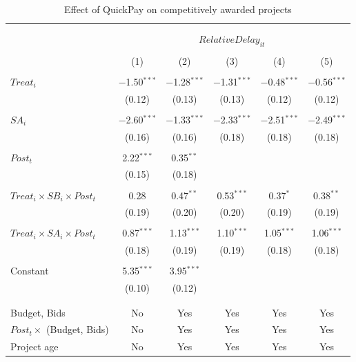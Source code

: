 \documentclass[
]{article}
\begin{document}
\begin{table}[H] \centering 
  \caption{Effect of QuickPay on competitively awarded projects} 
  \label{} 
\small 
\begin{tabular}{@{\extracolsep{-2pt}}lccccc} 
\\[-1.8ex]\hline 
\hline \\[-1.8ex] 
\\[-1.8ex] & \multicolumn{5}{c}{$RelativeDelay_{it}$  } \\ 
\\[-1.8ex] & (1) & (2) & (3) & (4) & (5)\\ 
\hline \\[-1.8ex] 
 $Treat_i$ & $-$1.50$^{***}$ & $-$1.28$^{***}$ & $-$1.31$^{***}$ & $-$0.48$^{***}$ & $-$0.56$^{***}$ \\ 
  & (0.12) & (0.13) & (0.13) & (0.12) & (0.12) \\ 
  & & & & & \\ 
 $SA_i$ & $-$2.60$^{***}$ & $-$1.33$^{***}$ & $-$2.33$^{***}$ & $-$2.51$^{***}$ & $-$2.49$^{***}$ \\ 
  & (0.16) & (0.16) & (0.18) & (0.18) & (0.18) \\ 
  & & & & & \\ 
 $Post_t$ & 2.22$^{***}$ & 0.35$^{**}$ &  &  &  \\ 
  & (0.15) & (0.18) &  &  &  \\ 
  & & & & & \\ 
 $Treat_i \times SB_i \times Post_t$ & 0.28 & 0.47$^{**}$ & 0.53$^{***}$ & 0.37$^{*}$ & 0.38$^{**}$ \\ 
  & (0.19) & (0.20) & (0.20) & (0.19) & (0.19) \\ 
  & & & & & \\ 
 $Treat_i \times SA_i \times Post_t$ & 0.87$^{***}$ & 1.13$^{***}$ & 1.10$^{***}$ & 1.05$^{***}$ & 1.06$^{***}$ \\ 
  & (0.18) & (0.19) & (0.19) & (0.18) & (0.18) \\ 
  & & & & & \\ 
 Constant & 5.35$^{***}$ & 3.95$^{***}$ &  &  &  \\ 
  & (0.10) & (0.12) &  &  &  \\ 
  & & & & & \\ 
\hline \\[-1.8ex] 
Budget, Bids & No & Yes & Yes & Yes & Yes \\ 
$Post_t \times $  (Budget, Bids) & No & Yes & Yes & Yes & Yes \\ 
Project age & No & Yes & Yes & Yes & Yes \\ 

\end{tabular}
\end{table}
\end{document}
